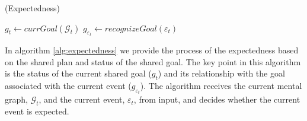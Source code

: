 \documentclass[letterpaper]{article}
\begin{document}
\begin{algorithm}
	\caption{(Expectedness)}
	\label{alg:expectedness}
	\begin{algorithmic}[1]
			\Statex
			\State $\mathit{g}_{t} \gets \textit{currGoal}{(\mathcal{G}_{t})}$
			\State $\mathit{g}_{\varepsilon_t} \gets \textit{recognizeGoal}{(\varepsilon_t)}$
			\Statex
				\State {}
			\EndIf
			\Statex
				\State {}
			\Else
					\State {}
				\Else
							\State {}
						\Else
							\State {}
						\EndIf
					\Else
							\State {}
						\Else
								\State {}
							\Else
								\State {}
							\EndIf
						\EndIf
					\EndIf
				\EndIf
			\EndIf
		\EndFunction
	\end{algorithmic}
\end{algorithm}

In algorithm \ref{alg:expectedness} we provide the process of the expectedness
based on the shared plan and status of the shared goal. The key point in this
algorithm is the status of the current shared goal ($\mathit{g}_{t}$) and its
relationship with the goal associated with the current event 
($\mathit{g}_{\varepsilon_t}$).  The algorithm receives the current mental
graph, $\mathcal{G}_{t}$, and the current event, $\varepsilon_t$, from input,
and decides whether the current event is expected. 
\end{document}
